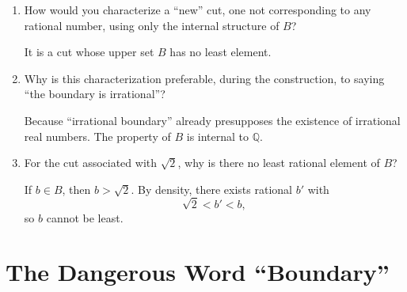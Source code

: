 \documentclass{self-check}
\begin{document}
\begin{enumerate}[label=\arabic*., itemsep=10pt]
\item How would you characterize a ``new'' cut, one not corresponding to any rational number, using only the internal structure of $B$?

\begin{answer}
It is a cut whose upper set $B$ has no least element.
\end{answer}

\item Why is this characterization preferable, during the construction, to saying
``the boundary is irrational''?

\begin{answer}
Because ``irrational boundary'' already presupposes the existence of irrational real numbers. The property of $B$ is internal to $\mathbb{Q}$.
\end{answer}

\item For the cut associated with $\sqrt{2}$, why is there no least rational element of $B$?

\begin{answer}
If $b\in B$, then $b>\sqrt2$. By density, there exists rational $b'$ with
\[
\sqrt2<b'<b,
\]
so $b$ cannot be least.
\end{answer}

\end{enumerate}

\section{The Dangerous Word ``Boundary''}
\end{document}
